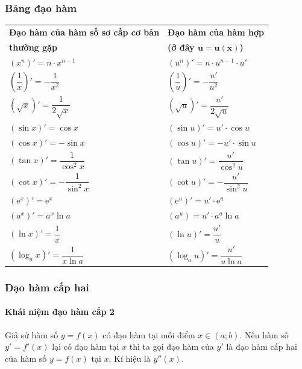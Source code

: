 \subsubsection*{Bảng đạo hàm}
\begin{center}
	\renewcommand{\arraystretch}{2}
	\begin{longtable}{|C{0.45\textwidth}|C{0.45\textwidth}|}
	\hline
	\centerline{\bf Đạo hàm của hàm số sơ cấp cơ bản}& \centerline{\bf Đạo hàm của hàm hợp} \\ [-.5cm]
	\centerline{\bf thường gặp} & \centerline{\bf(ở đây $\mathbf{u=u(x)}$)}\\
	\hline
	$\left(x^n\right)'=n\cdot x^{n -1}$ & $\left(u^n\right)'=n\cdot u^{n-1}\cdot u'$\\
	\hline
	$\left(\dfrac{1}{x}\right)'=-\dfrac{1}{x^2}$& $\left(\dfrac{1}{u}\right)'=-\dfrac{u'}{u^2}$\\
	\hline
	$\left(\sqrt{x}\right)'=\dfrac{1}{2\sqrt{x}}$&
	$\left(\sqrt{u}\right)'=\dfrac{u'}{2\sqrt{u}}$\\
	\hline
	$\left(\sin x\right)'=\cos x$& $\left(\sin u\right)'=u'\cdot \cos u$\\
	\hline
	$\left(\cos x\right)'=-\sin x$& $\left(\cos u\right)'=-u'\cdot\sin u $ \\
	\hline
	$\left(\tan x\right)'=\dfrac{1}{\cos^2 x}$&$\left(\tan u\right)'=\dfrac{u'}{\cos^2 u}$ \\
	\hline
	$\left(\cot x\right)'=-\dfrac{1}{\sin^2 x}$&$\left(\cot u\right)'=-\dfrac{u'}{\sin^2 u}$ \\
	\hline
	$\left(\mathrm{e}^x\right)'=\mathrm{e}^{x}$& $\left(\mathrm{e}^{u}\right)'=u'\cdot \mathrm{e}^{u}$ \\
	\hline
	$\left(a^{x}\right)'=a^{x}\ln a$&$\left(a^{u}\right)=u'\cdot a^{u}\ln a$ \\
	\hline
	$\left(\ln x\right)'=\dfrac{1}{x}$& $\left(\ln u\right)'=\dfrac{u'}{u}$ \\
	\hline
	$\left(\log_{a}x\right)' =\dfrac{1}{x\ln a}$& $\left(\log_{a} u\right)'=\dfrac{u'}{u\ln a}$\\
	\hline
	\end{longtable}
\end{center}
\subsubsection{Đạo hàm cấp hai}
\paragraph{Khái niệm đạo hàm cấp 2}
\begin{dn}
	Giả sử hàm số $y=f(x)$ có đạo hàm tại mỗi điểm $x\in (a;b)$. Nếu hàm số $y'=f'(x)$ lại có đạo hàm tại $x$ thì ta gọi đạo hàm của $y'$ là đạo hàm cấp hai của hàm số $y=f(x)$ tại $x$. Kí hiệu là $y''(x)$.
\end{dn}
